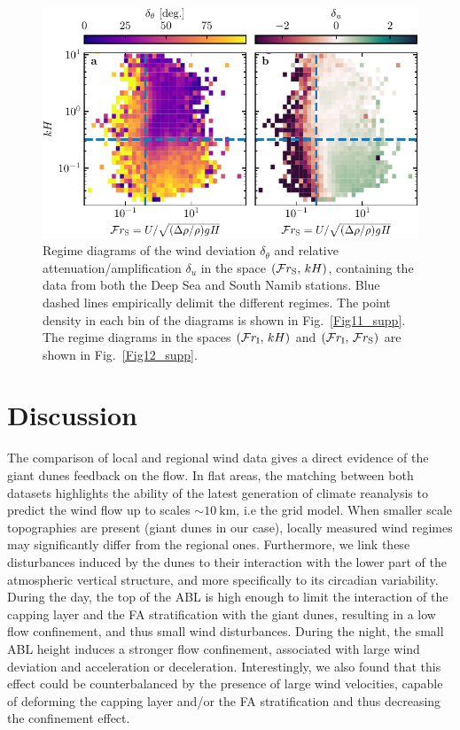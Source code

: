  \begin{figure}
    \centering
    \includegraphics[scale=1]{Figures/Figure5.pdf}
    \caption{Regime diagrams of the wind deviation $\delta_{\theta}$ and relative attenuation/amplification $\delta_{u}$ in the space $(\mathcal{F}r_{\textup{S}}, \, kH)$, containing the data from both the Deep Sea and South Namib stations. Blue dashed lines empirically delimit the different regimes. The point density in each bin of the diagrams is shown in Fig.~\ref{Fig11_supp}. The regime diagrams in the spaces $(\mathcal{F}r_{\textup{I}}, \, kH)$ and $(\mathcal{F}r_{\textup{I}}, \, \mathcal{F}r_{\textup{S}})$ are shown in Fig.~\ref{Fig12_supp}.}
    \label{Fig5}
  \end{figure}

\section{Discussion}

 The comparison of local and regional wind data gives a direct evidence of the giant dunes feedback on the flow. In flat areas, the matching between both datasets highlights the ability of the latest generation of climate reanalysis to predict the wind flow up to scales $\sim 10~\textrm{km}$, i.e the grid model. When smaller scale topographies are present (giant dunes in our case), locally measured wind regimes may significantly differ from the regional ones. Furthermore, we link these disturbances induced by the dunes to their interaction with the lower part of the atmospheric vertical structure, and more specifically to its circadian variability. During the day, the top of the ABL is high enough to limit the interaction of the capping layer and the FA stratification with the giant dunes, resulting in a low flow confinement, and thus small wind disturbances. During the night, the small ABL height induces a stronger flow confinement, associated with large wind deviation and acceleration or deceleration. Interestingly, we also found that this effect could be counterbalanced by the presence of large wind velocities, capable of deforming the capping layer and/or the FA stratification and thus decreasing the confinement effect.

